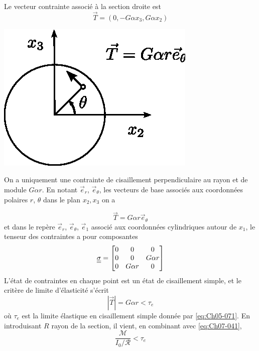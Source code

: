 Le vecteur contrainte associé à la section droite est
\begin{equation}
    \vec{T} = \left( 0, -G\alpha x_3, G \alpha x_2 \right)
    \label{eq:Ch07-042}
\end{equation}
\begin{multicols}{2}
    \begin{center}
        \includegraphics{../images/T1_Ch07-11}
    \end{center}
    \columnbreak
    On a uniquement une contrainte de cisaillement perpendiculaire au rayon et de module $G\alpha r$.
    En notant $\vec{e}_r$, $\vec{e}_{\theta}$, les vecteurs de base associés aux coordonnées polaires $r$, $\theta$ dans le plan $x_2,x_3$ on a
\end{multicols}
\begin{equation}
    \vec{T} = G \alpha r \vec{e}_{\theta} 
    \label{eq:Ch07-043}
\end{equation}
et dans le repère $\vec{e}_r$, $\vec{e}_{\theta}$, $\vec{e}_{1}$ associé aux coordonnées cylindriques autour de $x_1$, le tenseur des contraintes a pour composantes
\begin{equation}
    \underline{\underline{\sigma}} = 
    \begin{bmatrix}
        0 & 0 & 0\\
        0 & 0 & G\alpha r\\
        0 & G\alpha r & 0
    \end{bmatrix}
    \label{eq:Ch07-044}
\end{equation}
L'état de contraintes en chaque point est un état de cisaillement simple, et le critère de limite d'élasticité s'écrit
\begin{equation}
    |\vec{T}| = G \alpha r < \tau_e    
    \label{eq:Ch07-045} 
\end{equation}
où $\tau_e$ est la limite élastique en cisaillement simple donnée par \eqref{eq:Ch05-071}.
En introduisant $R$ rayon de la section, il vient, en combinant avec \eqref{eq:Ch07-041},
\begin{equation}
    \frac{\mathcal{M}}{I_0/\mathcal{R}} < \tau_e    
    \label{eq:Ch07-046} 
\end{equation}

